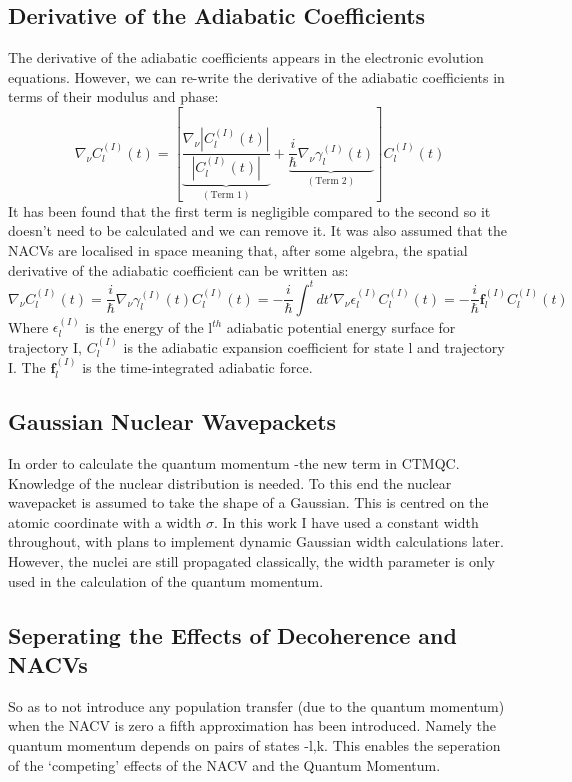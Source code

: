 \subsection{Derivative of the Adiabatic Coefficients}
The derivative of the adiabatic coefficients appears in the electronic evolution equations. However, we can re-write the derivative of the adiabatic coefficients in terms of their modulus and phase:
\begin{equation}
  \nabla_{\nu} C_{l}^{(I)}(t) = \left[ \underbrace{\frac{\nabla_{\nu} |C_{l}^{(I)}(t)|}{|C_{l}^{(I)}(t)|}}_{(\text{Term 1})} + \underbrace{\frac{i}{\hbar} \nabla_{\nu} \gamma_{l}^{(I)}(t)}_{(\text{Term 2})}\right] C_{l}^{(I)}(t)
\end{equation}
It has been found that the first term is negligible compared to the second \cite{abedi_dynamical_2013, agostini_mixed_2013, agostini_exact_2015} so it doesn't need to be calculated and we can remove it. It was also assumed that the NACVs are localised in space meaning that, after some algebra, the spatial derivative of the adiabatic coefficient can be written as:
\begin{equation}
  \nabla_{\nu} C_{l}^{(I)}(t) = \frac{i}{\hbar} \nabla_{\nu} \gamma_{l}^{(I)}(t) C_{l}^{(I)}(t) = -\frac{i}{\hbar} \int^{t} dt' \nabla_{\nu} \epsilon_{l}^{(I)} C_{l}^{(I)}(t) = -\frac{i}{\hbar} \textbf{f}_{l}^{(I)} C_{l}^{(I)}(t)
  \label{eq:hist_force}
\end{equation}
Where $\epsilon_{l}^{(I)}$ is the energy of the l$^{th}$ adiabatic potential energy surface for trajectory I, $C_{l}^{(I)}$ is the adiabatic expansion coefficient for state l and trajectory I. The $\textbf{f}_{l}^{(I)}$ is the time-integrated adiabatic force.
\subsection{Gaussian Nuclear Wavepackets}
In order to calculate the quantum momentum -the new term in CTMQC. Knowledge of the nuclear distribution is needed. To this end the nuclear wavepacket is assumed to take the shape of a Gaussian. This is centred on the atomic coordinate with a width $\sigma$. In this work I have used a constant width throughout, with plans to implement dynamic Gaussian width calculations later. However, the nuclei are still propagated classically, the width parameter is only used in the calculation of the quantum momentum.
\subsection{Seperating the Effects of Decoherence and NACVs}
So as to not introduce any population transfer (due to the quantum momentum) when the NACV is zero a fifth approximation has been introduced. Namely the quantum momentum depends on pairs of states -l,k. This enables the seperation of the `competing' effects of the NACV and the Quantum Momentum.
